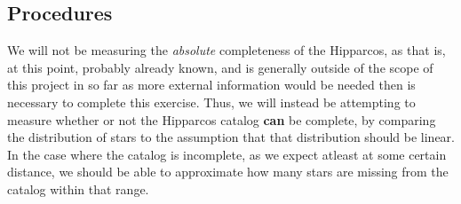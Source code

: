 \documentclass{business-covered} %
\begin{document}
	\subsection{Procedures}
		We will not be measuring the \textit{absolute} completeness of the Hipparcos, as that is, at this point, probably already known, and is generally outside of the scope of this project in so far as more external information would be needed then is necessary to complete this exercise. Thus, we will instead be attempting to measure whether or not the Hipparcos catalog \textbf{can} be complete, by comparing the distribution of stars to the assumption that that distribution should be linear. In the case where the catalog is incomplete, as we expect atleast at some certain distance, we should be able to approximate how many stars are missing from the catalog within that range.
		
\end{document}
